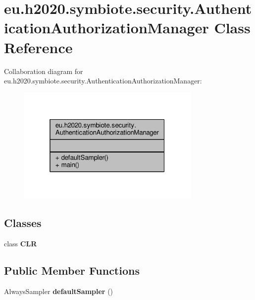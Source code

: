 \hypertarget{classeu_1_1h2020_1_1symbiote_1_1security_1_1AuthenticationAuthorizationManager}{}\section{eu.\+h2020.\+symbiote.\+security.\+Authentication\+Authorization\+Manager Class Reference}
\label{classeu_1_1h2020_1_1symbiote_1_1security_1_1AuthenticationAuthorizationManager}


Collaboration diagram for eu.\+h2020.\+symbiote.\+security.\+Authentication\+Authorization\+Manager\+:
\nopagebreak
\begin{figure}[H]
\begin{center}
\leavevmode
\includegraphics[width=253pt]{classeu_1_1h2020_1_1symbiote_1_1security_1_1AuthenticationAuthorizationManager__coll__graph}
\end{center}
\end{figure}
\subsection*{Classes}
\begin{DoxyCompactItemize}
\item 
class {\bfseries C\+LR}
\end{DoxyCompactItemize}
\subsection*{Public Member Functions}
\begin{DoxyCompactItemize}
\item 
Always\+Sampler {\bfseries default\+Sampler} ()\hypertarget{classeu_1_1h2020_1_1symbiote_1_1security_1_1AuthenticationAuthorizationManager_a36a9f29e75344a484082ac9e4fed677c}{}\label{classeu_1_1h2020_1_1symbiote_1_1security_1_1AuthenticationAuthorizationManager_a36a9f29e75344a484082ac9e4fed677c}

\end{DoxyCompactItemize}
